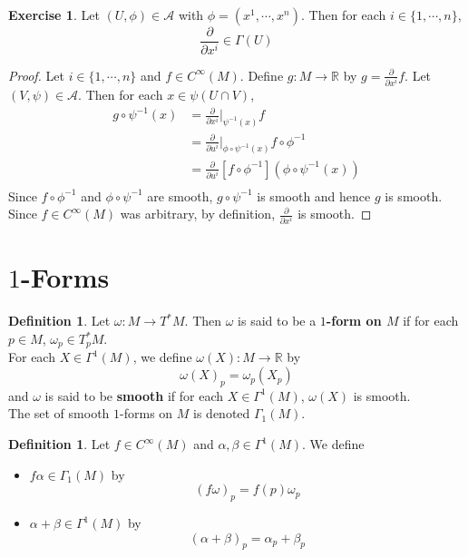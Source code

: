 \documentclass{book}
\theoremstyle{definition}
\newtheorem{defn}[definition]{Definition}
\newtheorem{ex}[definition]{Exercise}
\newcommand{\al}{\alpha}
\newcommand{\be}{\beta}
\newcommand{\om}{\omega}
\newcommand{\Gam}{\Gamma}
\newcommand{\R}{\mathbb{R}}
\newcommand{\MA}{\mathcal{A}}
\DeclareMathOperator*{\0}{\mbf{0}}
\DeclareMathOperator*{\1}{\mbf{1}}
\newcommand{\p}{\partial}
\begin{document}
	\begin{ex}
	Let $(U, \phi) \in \MA$ with $\phi = (x^1, \cdots, x^n)$. Then for each $i \in \{1, \cdots, n\}$, $$\frac{\p}{\p x^i} \in \Gam(U)$$
	\end{ex}
	
	\begin{proof}
	Let $i \in \{1, \cdots, n\}$ and $f \in C^{\infty}(M)$. Define $g: M \rightarrow \R$ by $g =\frac{\p}{\p x^i} f$. Let $(V, \psi) \in \MA$. Then for each $x \in \psi(U \cap V)$, 
	\begin{align*}
	g \circ \psi^{-1}(x) 
	&= \frac{\p}{\p x^i} \bigg|_{\psi^{-1}(x)}f \\
	&= \frac{\p}{\p u^i} \bigg|_{\phi \circ \psi^{-1}(x)}f \circ \phi^{-1}  \\
	&= \frac{\p}{\p u^i}[f \circ \phi^{-1}] ( \phi \circ \psi^{-1} (x))\\
\end{align*}	 
	Since $f \circ \phi^{-1}$ and $\phi \circ \psi^{-1}$ are smooth, $g \circ \psi^{-1}$ is smooth and hence $g$ is smooth. Since $f \in C^{\infty}(M)$ was arbitrary, by definition, $\frac{\p}{\p x^i}$ is smooth. 
	\end{proof}
	
	
	
	
	
	
	
	\newpage
	\section{$1$-Forms}
	
	\begin{defn}
		Let $\om: M \rightarrow T^*M$. Then $\om$ is said to be a \textbf{$1$-form on $M$} if for each $p \in M$, $\om_p \in T^*_p M$. \\
		For each $X \in \Gam^1(M)$, we define $\om(X) : M \rightarrow \R$ by $$\om(X)_p = \om_p(X_p)$$
		and $\om$ is said to be \textbf{smooth} if for each $X \in \Gam^1(M)$, $\om(X)$ is smooth. \\
		The set of smooth $1$-forms on $M$ is denoted $\Gam_1(M)$.\\
	\end{defn}

	\begin{defn}
	Let $f \in C^{\infty}(M)$ and $\al,\be \in \Gam^1(M)$. We define 
	\begin{itemize}
	\item $f\al \in \Gam_1(M)$ by $$(f\om)_p = f(p)\om_p$$
	\item $\al+\be \in \Gam^1(M)$ by $$(\al+\be)_p = \al_p+\be_p$$
	\end{itemize}
	\end{defn}
	
\end{document}
